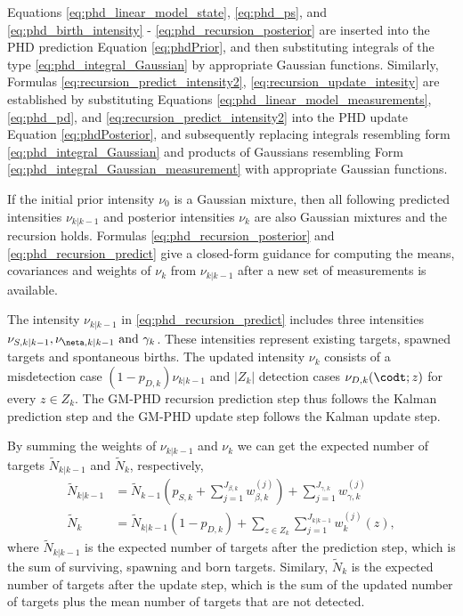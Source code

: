 Equations \eqref{eq:phd_linear_model_state}, \eqref{eq:phd_ps}, and \eqref{eq:phd_birth_intensity} - \eqref{eq:phd_recursion_posterior} are inserted into the PHD prediction Equation \eqref{eq:phdPrior}, and then substituting
integrals of the type \eqref{eq:phd_integral_Gaussian} by appropriate Gaussian functions. Similarly, Formulas
\eqref{eq:recursion_predict_intensity2}, \eqref{eq:recursion_update_intesity} are established by substituting Equations \eqref{eq:phd_linear_model_measurements}, \eqref{eq:phd_pd}, and \eqref{eq:recursion_predict_intensity2} into the PHD update Equation \eqref{eq:phdPosterior}, and subsequently replacing integrals resembling form \eqref{eq:phd_integral_Gaussian} and products of Gaussians resembling Form \eqref{eq:phd_integral_Gaussian_measurement} with appropriate Gaussian functions.

If the initial prior intensity $\nu_0$ is a Gaussian mixture, then all following predicted intensities $\nu_{k|k-1}$
and posterior intensities $\nu_k$ are also Gaussian mixtures and the recursion holds. Formulas \eqref{eq:phd_recursion_posterior} and \eqref{eq:phd_recursion_predict} give a closed-form guidance for computing the means, covariances and weights of $\nu_k$ from $\nu_{k|k-1}$ after a new set of measurements is available.

The intensity $\nu_{k|k-1}$ in \eqref{eq:phd_recursion_predict} includes three intensities $\nu_{S,k|k-1}, \nu_{\neta,k|k-1} \text{ and } \gamma_k$. These intensities represent existing targets, spawned targets and spontaneous births. The updated intensity $\nu_k$ consists of a misdetection case $(1-p_{D,k})\nu_{k|k-1}$ and $|Z_k|$ detection cases $\nu_{D,k}(\codt;z)$ for every $z \in Z_k$. The GM-PHD recursion prediction step thus follows the Kalman prediction step and the GM-PHD update step follows the Kalman update step.

By summing the weights of $\nu_{k|k-1}$ and $\nu_k$ we can get the expected number of targets $\tilde{N}_{k|k-1}$ and $\tilde{N}_k$, respectively,
\begin{align}
    \tilde{N}_{k|k-1} &=\tilde{N}_{k-1} \left( p_{S,k} + \sum_{j=1}^{J_{\beta,k}} w_{\beta,k}^{(j)} \right) + \sum_{j=1}^{J_{\gamma,k}} w_{\gamma,k}^{(j)} \\
    \tilde{N}_k &= \tilde{N}_{k|k-1} (1 - p_{D,k}) + \sum_{z \in Z_k} \sum_{j=1}^{J_{k|k-1}} w_k^{(j)}(z),
\end{align}
where $\tilde{N}_{k|k-1}$ is the expected number of targets after the prediction step, which is the sum of surviving, spawning and born targets. Similary, $\tilde{N}_k$ is the expected number of targets after the update step, which is the sum of the updated number of targets plus the mean number of targets
that are not detected.

